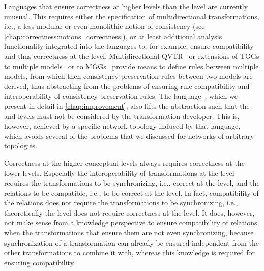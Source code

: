 Languages that ensure correctness at higher levels than the \leveltransformation level are currently unusual.
This requires either the specification of multidirectional transformations, i.e., a less modular or even monolithic notion of consistency (see \autoref{chap:correctness:notions_correctness}), or at least additional analysis functionality integrated into the languages to, for example, ensure compatibility and thus correctness at the \levelnetworkrule level.
Multidirectional \gls{QVTR}~\cite{macedo2014FrameworkMultiDirectional-BX} or extensions of \glspl{TGG} to multiple models~\cite{trollmann2015TransformationTGGtoMultiModel-ICMT,trollmann2016SynchronizationTGGtoMultiModel-ICMT} or to \glspl{MGG}~\cite{koenigs2006MGGs-SoSym} provide means to define rules between multiple models, from which then consistency preservation rules between two models are derived, thus abstracting from the problems of ensuring rule compatibility and interoperability of consistency  preservation rules.
The \commonalities language~, which we present in detail in \autoref{chap:improvement}, also lifts the abstraction such that the \levelnetworkrelation and \levelnetworkrule levels must not be considered by the transformation developer.
This is, however, achieved by a specific network topology induced by that language, which avoids several of the problems that we discussed for networks of arbitrary topologies.

Correctness at the higher conceptual levels always requires correctness at the lower levels.
Especially the interoperability of transformations at the \levelnetworkrule level requires the transformations to be synchronizing, i.e., correct at the \leveltransformation level, and the relations to be compatible, i.e., to be correct at the \levelnetworkrelation level.
In fact, compatibility of the relations does not require the transformations to be synchronizing, i.e., theoretically the \levelnetworkrelation level does not require correctness at the \leveltransformation level.
It does, however, not make sense from a knowledge perspective to ensure compatibility of relations when the transformations that ensure them are not even synchronizing, because synchronization of a transformation can already be ensured independent from the other transformations to combine it with, whereas this knowledge is required for ensuring compatibility.


